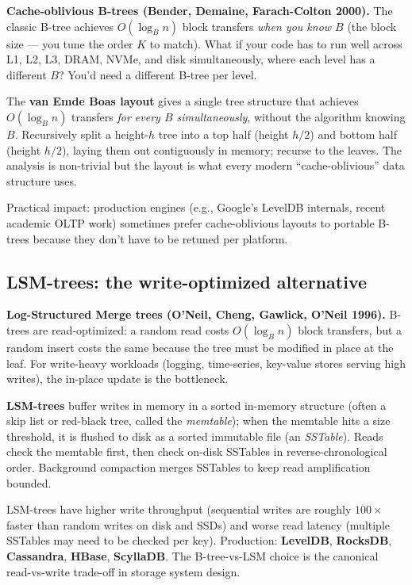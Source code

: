 \documentclass[11pt]{article}
\begin{document}
\begin{notebox}
\textbf{Cache-oblivious B-trees (Bender, Demaine, Farach-Colton
2000).} The classic B-tree achieves $O(\log_B n)$ block transfers
\emph{when you know $B$} (the block size --- you tune the order $K$
to match). What if your code has to run well across L1, L2, L3,
DRAM, NVMe, and disk simultaneously, where each level has a
different $B$? You'd need a different B-tree per level.

The \textbf{van Emde Boas layout} gives a single tree structure that
achieves $O(\log_B n)$ transfers \emph{for every $B$ simultaneously},
without the algorithm knowing $B$. Recursively split a height-$h$
tree into a top half (height $h/2$) and bottom half (height $h/2$),
laying them out contiguously in memory; recurse to the leaves. The
analysis is non-trivial but the layout is what every modern
``cache-oblivious'' data structure uses.

Practical impact: production engines (e.g., Google's LevelDB
internals, recent academic OLTP work) sometimes prefer
cache-oblivious layouts to portable B-trees because they don't have
to be retuned per platform.
\end{notebox}

\subsection*{LSM-trees: the write-optimized alternative}

\begin{notebox}
\textbf{Log-Structured Merge trees (O'Neil, Cheng, Gawlick, O'Neil
1996).} B-trees are read-optimized: a random read costs
$O(\log_B n)$ block transfers, but a random insert costs the same
because the tree must be modified in place at the leaf. For
write-heavy workloads (logging, time-series, key-value stores
serving high writes), the in-place update is the bottleneck.

\textbf{LSM-trees} buffer writes in memory in a sorted in-memory
structure (often a skip list or red-black tree, called the
\emph{memtable}); when the memtable hits a size threshold, it is
flushed to disk as a sorted immutable file (an \emph{SSTable}).
Reads check the memtable first, then check on-disk SSTables in
reverse-chronological order. Background compaction merges SSTables
to keep read amplification bounded.

LSM-trees have higher write throughput (sequential writes are
roughly $100\times$ faster than random writes on disk and SSDs)
and worse read latency (multiple SSTables may need to be checked
per key). Production: \textbf{LevelDB}, \textbf{RocksDB},
\textbf{Cassandra}, \textbf{HBase}, \textbf{ScyllaDB}. The
B-tree-vs-LSM choice is the canonical read-vs-write trade-off in
storage system design.
\end{notebox}
\end{document}
